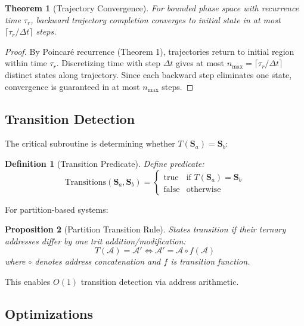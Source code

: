 \documentclass[twocolumn,10pt]{article}
\newtheorem{theorem}{Theorem}
\newtheorem{proposition}[theorem]{Proposition}
\newtheorem{definition}{Definition}
\begin{document}
\begin{theorem}[Trajectory Convergence]
\label{thm:convergence}
For bounded phase space with recurrence time $\tau_r$, backward trajectory completion converges to initial state in at most $\lceil \tau_r / \Delta t \rceil$ steps.
\end{theorem}

\begin{proof}
By Poincaré recurrence (Theorem 1), trajectories return to initial region within time $\tau_r$. Discretizing time with step $\Delta t$ gives at most $n_{\max} = \lceil \tau_r/\Delta t \rceil$ distinct states along trajectory. Since each backward step eliminates one state, convergence is guaranteed in at most $n_{\max}$ steps.
\end{proof}

\subsection{Transition Detection}

The critical subroutine is determining whether $T(\mathbf{S}_a) = \mathbf{S}_b$:

\begin{definition}[Transition Predicate]
Define predicate:
\begin{equation}
\text{Transitions}(\mathbf{S}_a, \mathbf{S}_b) =
\begin{cases}
\text{true} & \text{if } T(\mathbf{S}_a) = \mathbf{S}_b \\
\text{false} & \text{otherwise}
\end{cases}
\end{equation}
\end{definition}

For partition-based systems:

\begin{proposition}[Partition Transition Rule]
States transition if their ternary addresses differ by one trit addition/modification:
\begin{equation}
T(\mathcal{A}) = \mathcal{A}' \iff \mathcal{A}' = \mathcal{A} \circ f(\mathcal{A})
\end{equation}
where $\circ$ denotes address concatenation and $f$ is transition function.
\end{proposition}

This enables $O(1)$ transition detection via address arithmetic.

\subsection{Optimizations}
\end{document}

